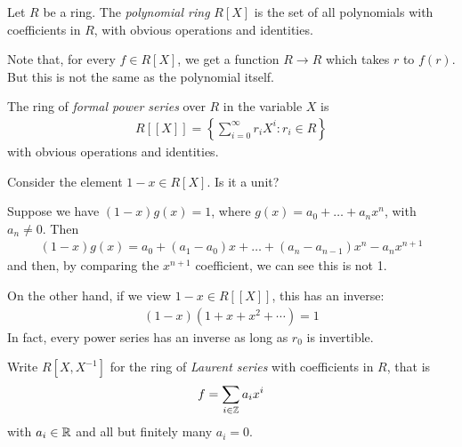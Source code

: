\documentclass{../template/note}
\begin{document}
    \begin{definition}
        Let $R$ be a ring. The \emph{polynomial ring} $R[X]$ is the set of all polynomials with coefficients in $R$, with obvious operations and identities.
    \end{definition}
    
    \begin{remark*}
        Note that, for every $f \in R[X]$, we get a function $R \to R$ which takes $r$ to $f(r)$. But this is not the same as the polynomial itself.
    \end{remark*}
    
    \begin{definition}
        The ring of \emph{formal power series} over $R$ in the variable $X$ is
        \begin{align*}
            R[[X]] = \left\{\sum_{i=0}^\infty r_iX^i : r_i \in R\right\}
        \end{align*}
        with obvious operations and identities.
    \end{definition}
    
    \begin{example}
        Consider the element $1-x \in R[X]$. Is it a unit?

        Suppose we have $(1-x)g(x) = 1$, where $g(x) = a_0 + \dots + a_nx^n$, with $a_n \neq 0$. Then
        \begin{align*}
            (1-x)g(x) = a_0 + (a_1-a_0)x + \dots + (a_n-a_{n-1})x^n - a_nx^{n+1}
        \end{align*}
        and then, by comparing the $x^{n+1}$ coefficient, we can see this is not 1.
        
        On the other hand, if we view $1-x \in R[[X]]$, this has an inverse:
        \begin{align*}
            (1-x)(1+x+x^2+\cdots)=1
        \end{align*}
        In fact, every power series has an inverse as long as $r_0$ is invertible.        
    \end{example}
    
    \begin{definition}
        Write $R[X, X^{-1}]$ for the ring of \emph{Laurent series} with coefficients in $R$, that is
        \begin{align*}
            f = \sum_{i \in \mathbb Z} a_ix^i
        \end{align*}
        with $a_i \in \mathbb R$ and all but finitely many $a_i = 0$.        
    \end{definition}
    
\end{document}
